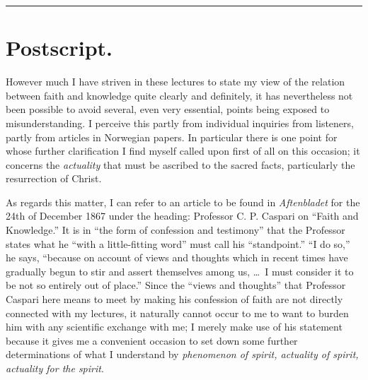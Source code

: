 \documentclass[12pt]{book}
\newcommand{\opage}[1]{\marginnote{\footnotesize\textit{[#1]}}}
\begin{document}
\begin{center}\rule{3cm}{0.4pt}\end{center}


\chapter*{Postscript.}
\label{ch:efterskrift}
\opage{297}\setcounter{footnote}{0}%
However much I have striven in these lectures to state my view of the
relation between faith and knowledge quite clearly and definitely, it
has nevertheless not been possible to avoid several, even very essential,
points being exposed to misunderstanding. I perceive this partly from
individual inquiries from listeners, partly from articles in Norwegian
papers. In particular there is one point for whose further clarification
I find myself called upon first of all on this occasion; it concerns the
\emph{actuality} that must be ascribed to the sacred facts, particularly
the resurrection of Christ.

As regards this matter, I can refer to an article to be found in
\emph{Aftenbladet} for the 24th of December 1867 under the heading:
Professor C. P. Caspari on ``Faith and Knowledge.'' It is in ``the form of
confession and testimony'' that the Professor states what he ``with a
little-fitting word'' must call his ``standpoint.'' ``I do so,'' he says,
``because on account of views and thoughts which in recent times have
gradually begun to stir and assert themselves among us, \ldots\ I must
consider it to be not so entirely out of place.'' Since the ``views and
thoughts'' that Professor Caspari here means to meet by making his
confession of faith are not directly connected with my lectures, it
naturally cannot occur to me to want to burden
\opage{298}\setcounter{footnote}{0}%
him with any scientific exchange with me; I merely make use of his
statement because it gives me a convenient occasion to set down some
further determinations of what I understand by \emph{phenomenon of spirit,
actuality of spirit, actuality for the spirit}.
\end{document}
